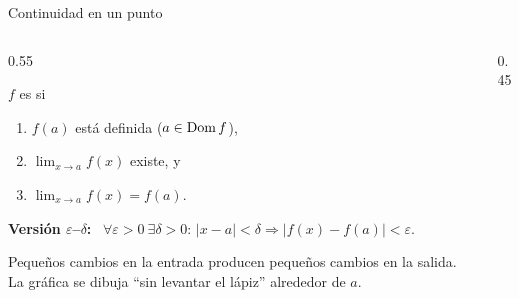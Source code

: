 \documentclass[10pt,aspectratio=169]{beamer}
\begin{document}
\begin{frame}{Continuidad en un punto}
  \begin{columns}
    \begin{column}{0.55\textwidth}
      \begin{definicion}
        $f$ es  si
        \begin{enumerate}
          \item $f(a)$ está definida ($a\in\operatorname{Dom} f$),
          \item $\lim_{x\to a}f(x)$ existe, y
          \item $\lim_{x\to a}f(x)=f(a)$.
        \end{enumerate}
      \end{definicion}
      \textbf{Versión $\varepsilon$--$\delta$:} \ $\forall\varepsilon>0\ \exists\delta>0$: $|x-a|<\delta\Rightarrow|f(x)-f(a)|<\varepsilon$.
      \begin{idea}
        Pequeños cambios en la entrada producen pequeños cambios en la salida. La gráfica se dibuja ``sin levantar el lápiz''
        alrededor de $a$.
      \end{idea}
    \end{column}
    \begin{column}{0.45\textwidth}
      \centering
    \end{column}
  \end{columns}
\end{frame}
\end{document}
